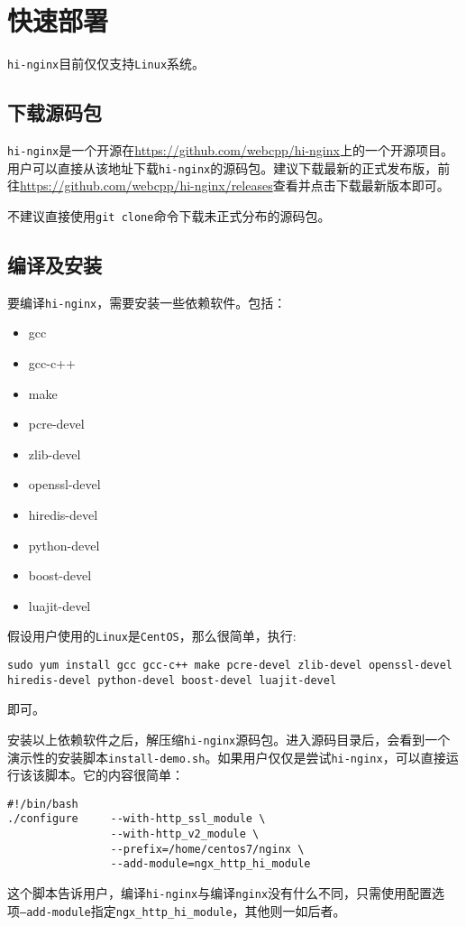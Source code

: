\section{快速部署}
\texttt{hi-nginx}目前仅仅支持\texttt{Linux}系统。

\subsection{下载源码包}
\texttt{hi-nginx}是一个开源在\url{https://github.com/webcpp/hi-nginx}上的一个开源项目。用户可以直接从该地址下载\texttt{hi-nginx}的源码包。建议下载最新的正式发布版，前往\url{https://github.com/webcpp/hi-nginx/releases}查看并点击下载最新版本即可。

不建议直接使用\texttt{git clone}命令下载未正式分布的源码包。

\subsection{编译及安装}
要编译\texttt{hi-nginx}，需要安装一些依赖软件。包括：
\begin{itemize}
\item gcc
\item gcc-c++
\item make
\item pcre-devel
\item zlib-devel
\item openssl-devel
\item hiredis-devel
\item python-devel
\item boost-devel
\item luajit-devel
\end{itemize}
假设用户使用的\texttt{Linux}是\texttt{CentOS}，那么很简单，执行:
\begin{lstlisting}
sudo yum install gcc gcc-c++ make pcre-devel zlib-devel openssl-devel hiredis-devel python-devel boost-devel luajit-devel
\end{lstlisting}
即可。

安装以上依赖软件之后，解压缩\texttt{hi-nginx}源码包。进入源码目录后，会看到一个演示性的安装脚本\texttt{install-demo.sh}。如果用户仅仅是尝试\texttt{hi-nginx}，可以直接运行该该脚本。它的内容很简单：
\begin{lstlisting}
#!/bin/bash
./configure     --with-http_ssl_module \
                --with-http_v2_module \
                --prefix=/home/centos7/nginx \
                --add-module=ngx_http_hi_module
\end{lstlisting}
这个脚本告诉用户，编译\texttt{hi-nginx}与编译\texttt{nginx}没有什么不同，只需使用配置选项\texttt{--add-module}指定\texttt{ngx_http_hi_module}，其他则一如后者。

